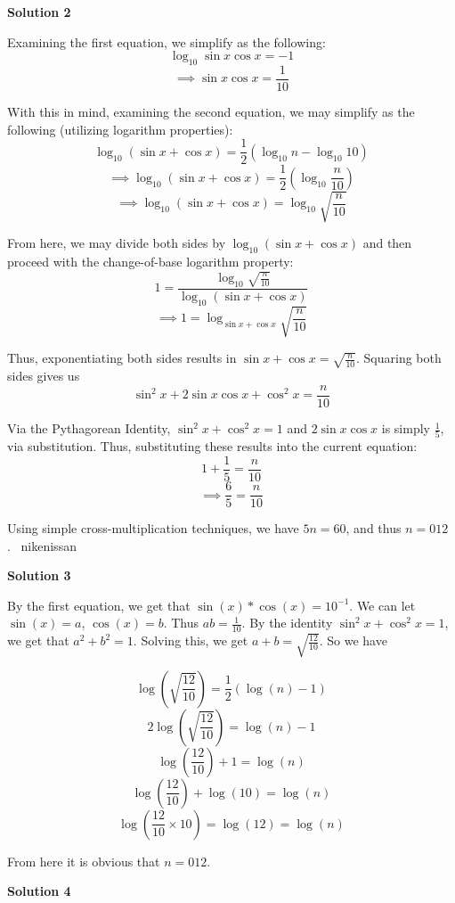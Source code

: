 \begin{enumerate}
\textbf{Solution 2}

Examining the first equation, we simplify as the following:
 \[\log_{10} \sin x \cos x = -1\]
 \[\implies \sin x \cos x = \frac{1}{10}\]

 With this in mind, examining the second equation, we may simplify as the following (utilizing logarithm properties):
 \[\log_{10} (\sin x + \cos x) = \frac{1}{2} (\log_{10} n - \log_{10} 10)\]
 \[\implies \log_{10} (\sin x + \cos x) = \frac{1}{2} (\log_{10} \frac{n}{10})\]
 \[\implies \log_{10} (\sin x + \cos x) = \log_{10} \sqrt{\frac{n}{10}}\]

 From here, we may divide both sides by $\log_{10} (\sin x + \cos x)$ and then proceed with the change-of-base logarithm property:
 \[1 = \frac{\log_{10} \sqrt{\frac{n}{10}}}{\log_{10} (\sin x + \cos x)}\]
 \[\implies 1 = \log_{\sin x + \cos x} \sqrt{\frac{n}{10}}\]

 Thus, exponentiating both sides results in $\sin x + \cos x = \sqrt{\frac{n}{10}}$. Squaring both sides gives us 
 \[\sin^2 x + 2\sin x \cos x + \cos^2 x = \frac{n}{10}\]

 Via the Pythagorean Identity, $\sin^2 x + \cos^2 x = 1$ and $2\sin x \cos x$ is simply $\frac{1}{5}$, via substitution. Thus, substituting these results into the current equation:
 \[1 + \frac{1}{5} = \frac{n}{10}\]
 \[\implies \frac{6}{5} = \frac{n}{10}\]

 Using simple cross-multiplication techniques, we have $5n = 60$, and thus $\boxed{n = 012}$.~ nikenissan

 


 



\textbf{Solution 3}

By the first equation, we get that $\sin(x)*\cos(x)=10^{-1}$. We can let $\sin(x)=a$, $\cos(x)=b$. Thus $ab=\frac{1}{10}$. By the identity $\sin^2x+\cos^2x=1$, we get that $a^2+b^2=1$. Solving this, we get $a+b=\sqrt{\frac{12}{10}}$. So we have

 
 \[\log\left(\sqrt{\frac{12}{10}}\right)=\frac12(\log(n)-1)\]
 \[2\log\left(\sqrt{\frac{12}{10}}\right)=\log(n)-1\]
 \[\log\left(\frac{12}{10}\right)+1=\log(n)\]
 \[\log\left(\frac{12}{10}\right)+\log(10)=\log(n)\]
 \[\log\left(\frac{12}{10}\times 10\right)=\log(12)=\log(n)\]

 From here it is obvious that $\boxed{n=012}$.

 



\textbf{Solution 4}


\end{enumerate}
